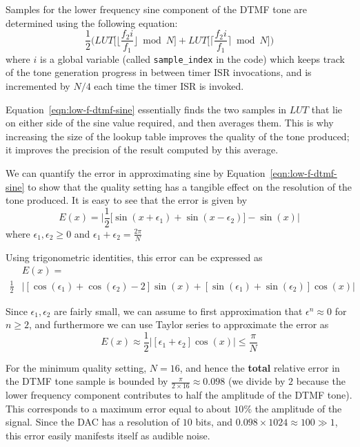 \documentclass[11pt,a4paper,twocolumn]{scrartcl}
\begin{document}
Samples for the lower frequency sine component of the DTMF tone are determined using the following equation:
\begin{equation}
   \label{eqn:low-f-dtmf-sine}
   \frac{1}{2}\Bigg(LUT\bigg[\bigg\lfloor\frac{f_2i}{f_1}\bigg\rfloor \bmod N\bigg] + LUT\bigg[\bigg\lceil\frac{f_2i}{f_1}\bigg\rceil \bmod N\bigg]\Bigg)
\end{equation}
where $i$ is a global variable (called \verb!sample_index! in the code) which keeps track of the tone generation progress in between timer ISR invocations, and is incremented by $N/4$ each time the timer ISR is invoked.

Equation~\ref{eqn:low-f-dtmf-sine} essentially finds the two samples in $LUT$ that lie on either side of the sine value required, and then averages them. This is why increasing the size of the lookup table improves the quality of the tone produced; it improves the precision of the result computed by this average.

We can quantify the error in approximating sine by Equation~\ref{eqn:low-f-dtmf-sine} to show that the quality setting has a tangible effect on the resolution of the tone produced. It is easy to see that the error is given by
$$ E(x) = \bigg|\frac{1}{2}\bigg[\sin(x + \epsilon_1) + \sin(x - \epsilon_2)\bigg] - \sin(x)\bigg| $$
where $\epsilon_1, \epsilon_2 \ge 0$ and $\epsilon_1 + \epsilon_2 = \frac{2\pi}{N}$

Using trigonometric identities, this error can be expressed as
\begin{align*}
&E(x) =\\ 
\frac{1}{2}&\bigg|[\cos(\epsilon_1) + \cos(\epsilon_2) - 2]\sin(x) + [\sin(\epsilon_1) + \sin(\epsilon_2)]\cos(x)\bigg|
\end{align*}

Since $\epsilon_1, \epsilon_2$ are fairly small, we can assume to first approximation that $\epsilon^n \approx 0$ for $n \ge 2$, and furthermore we can use Taylor series to approximate the error as
$$ E(x) \approx \frac{1}{2}\bigg|[\epsilon_1 + \epsilon_2]\cos(x)\bigg| \le \frac{\pi}{N} $$

For the minimum quality setting, $N = 16$, and hence the \textbf{total} relative error in the DTMF tone sample is bounded by $\frac{\pi}{2\times 16} \approx 0.098$ (we divide by $2$ because the lower frequency component contributes to half the amplitude of the DTMF tone). This corresponds to a maximum error equal to about $10\%$ the amplitude of the signal. Since the DAC has a resolution of $10$ bits, and $0.098 \times 1024 \approx 100 \gg 1$, this error easily manifests itself as audible noise. 
\end{document}
